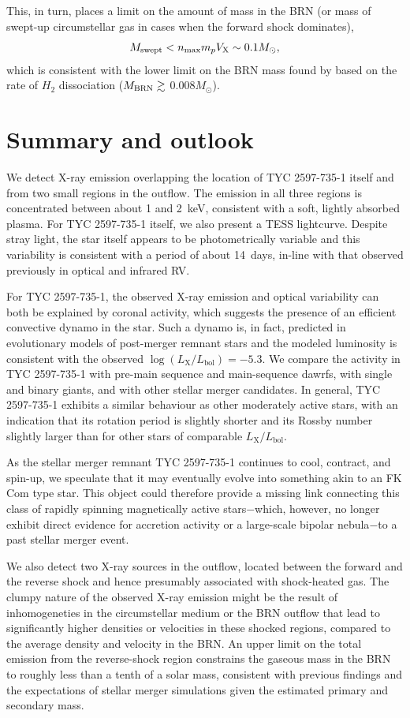 \documentclass[linenumbers]{aastex631}
\newcommand{\be}{\begin{equation}}
\newcommand{\ee}{\end{equation}}
\begin{document}
This, in turn, places a limit on the amount of mass in the BRN (or mass of swept-up circumstellar gas in cases when the forward shock dominates),
\be
M_{\rm swept} < n_{\rm max} m_p V_{\rm X} \sim 0.1M_{\odot},
\ee
which is consistent with the lower limit on the BRN mass found by \citet{2020Natur.587..387H} based on the rate of $H_2$ dissociation ($M_{\rm BRN} \gtrsim$ 0.008$M_{\odot}$).


\section{Summary and outlook}
\label{sec:summary}
We detect X-ray emission overlapping the location of TYC 2597-735-1 itself and from two small regions in the outflow. The emission in all three regions is concentrated between about 1 and 2~keV, consistent with a soft, lightly absorbed plasma.  For TYC 2597-735-1 itself, we also present a TESS lightcurve. Despite stray light, the star itself appears to be photometrically variable and this variability is consistent with a period of about 14~days, in-line with that observed previously in optical and infrared RV.

For TYC 2597-735-1, the observed X-ray emission and optical variability can both be explained by coronal activity, which suggests the presence of an efficient convective dynamo in the star. Such a dynamo is, in fact, predicted in evolutionary models of post-merger remnant stars and the modeled luminosity is consistent with the observed $\log(L_\mathrm{X}/L_\mathrm{bol})=-5.3$.  We compare the activity in TYC 2597-735-1 with pre-main sequence and main-sequence dawrfs, with single and binary giants, and with other stellar merger candidates. In general, TYC 2597-735-1 exhibits a similar behaviour as other moderately active stars, with an indication that its rotation period is slightly shorter and its Rossby number slightly larger than for other stars of comparable $L_\mathrm{X}/L_\mathrm{bol}$.

As the stellar merger remnant TYC 2597-735-1 continues to cool, contract, and spin-up, we speculate that it may eventually evolve into something akin to an FK Com type star.  This object could therefore provide a missing link connecting this class of rapidly spinning magnetically active stars$-$which, however, no longer exhibit direct evidence for accretion activity or a large-scale bipolar nebula$-$to a past stellar merger event.

We also detect two X-ray sources in the outflow, located between the forward and the reverse shock and hence presumably associated with shock-heated gas. The clumpy nature of the observed X-ray emission might be the result of inhomogeneties in the circumstellar medium or the BRN outflow that lead to significantly higher densities or velocities in these shocked regions, compared to the average density and velocity in the BRN. An upper limit on the total emission from the reverse-shock region constrains the gaseous mass in the BRN to roughly less than a tenth of a solar mass, consistent with previous findings \citep{2020Natur.587..387H} and the expectations of stellar merger simulations given the estimated primary and secondary mass.
\end{document}
